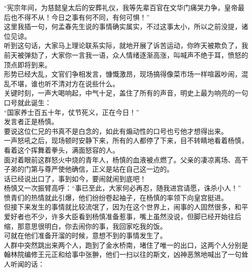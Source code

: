 \begin{multicols}{\theparacolNo}
“宪宗年间，为慈懿皇太后的安葬礼仪，我等先辈百官在文华门痛哭力争，皇帝最后也不得不从！今日之事有何不同，有何可惧！”\\

这里我插一句，何孟春先生说的事情确实属实，不过这事太小，所以之前没提，诸位见谅。\\

听到这句话，大家马上理论联系实际，就地开展了诉苦运动，你昨天被欺负了，我前天被弹劾了，大家你一言我一语，众人情绪逐渐高涨，叫喊声不绝于耳，愤怒的顶点即将到来。\\

形势已经大乱，文官们争相发言，慷慨激昂，现场搞得像菜市场一样喧嚣吵闹，混乱不堪，谁也听不清对方在说些什么。\\

关键时刻，一声大喝响起，中气十足，盖住了所有的声音，明史上最为响亮的一句口号就此诞生：\\

“国家养士百五十年，仗节死义，正在今日！”\\

发言者正是杨慎。\\

要说这位仁兄的书真不是白念的，如此有煽动性的口号也亏他才想得出来。\\

一声怒吼之后，现场顿时安静下来，所有的人都停了下来，目不转睛地看着杨慎，看着这个挥舞着拳头，满面怒容的人。\\

面对着眼前这群怒火中烧的青年人，杨慎的血液被点燃了。父亲的凄凉离场、高干子弟的门第与尊严使他确信，正义是站在自己这一边的。\\

话已经说出口了，事到如今，要闹就闹到底吧！\\

杨慎又一次振臂高呼：“事已至此，大家何必再忍，随我进宫请愿，诛杀小人！”\\

愤青们的热情就此引爆，他们纷纷卷起袖子，在杨慎的率领下向皇宫挺进。\\

但接下来发生的事情就比较流氓了，因为在这个世界上，闹事的人固然很多，和平爱好者也不少，许多大臣看到杨慎准备惹事，嘴上虽然没说，但脚已经开始往后缩，那意思很明白，你去闹你的事，我回家吃我的饭。\\

可就在他们准备开溜的时候，意想不到的事情发生了。\\

人群中突然跳出来两个人，跑到了金水桥南，堵住了唯一的出口，这两个人分别是翰林院编修王元正和给事中张翀，他们一扫以往的斯文，凶神恶煞地喊出了一句耸人听闻的话：\\


\end{multicols}

